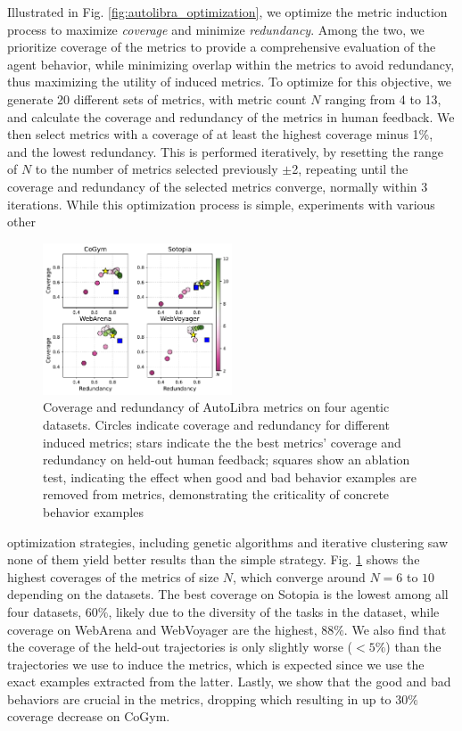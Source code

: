 Illustrated in Fig. \ref{fig:autolibra_optimization}, we optimize the metric induction
process to maximize \emph{coverage} and minimize \emph{redundancy}. Among the
two, we prioritize coverage of the metrics to provide a comprehensive evaluation
of the agent behavior, while minimizing overlap within the metrics to avoid
redundancy, thus maximizing the utility of induced metrics. To optimize for this
objective, we generate 20 different sets of metrics, with metric count $N$
ranging from 4 to 13, and calculate the coverage and redundancy of the metrics in
human feedback. We then select metrics with a coverage of at least the highest
coverage minus 1\%, and the lowest redundancy. This is performed iteratively, by
resetting the range of $N$ to the number of metrics selected previously $\pm$2,
repeating until the coverage and redundancy of the selected metrics converge, normally
within 3 iterations. While this optimization process is simple, experiments with
various other
\begin{figure}
	\vspace{-10pt}
	\includegraphics[width=0.5\textwidth]{figs/four_datasets_grid.pdf}
	\vspace{-15pt}
	\caption{Coverage and redundancy of AutoLibra metrics on four agentic datasets.
	Circles indicate coverage and redundancy for different induced metrics; stars
	indicate the the best metrics' coverage and redundancy on held-out human feedback;
	squares show an ablation test, indicating the effect when good and bad behavior
	examples are removed from metrics, demonstrating the criticality of concrete
	behavior examples}
	\label{fig:coverage-redundancy}
\end{figure}optimization strategies, including genetic algorithms and iterative
clustering saw none of them yield better results than the simple strategy. Fig. \ref{fig:coverage-redundancy}
shows the highest coverages of the metrics of size $N$, which converge around
$N=6$ to $10$ depending on the datasets. The best coverage on Sotopia \citep{zhousotopia}
is the lowest among all four datasets, $60\%$, likely due to the diversity of
the tasks in the dataset, while coverage on WebArena \citep{zhouwebarena} and
WebVoyager \citep{he2024webvoyager} are the highest, $88\%$. We also find that the
coverage of the held-out trajectories is only slightly worse ($<5\%$) than the trajectories
we use to induce the metrics, which is expected since we use the exact examples
extracted from the latter. Lastly, we show that the good and bad behaviors are
crucial in the metrics, dropping which resulting in up to $30\%$ coverage decrease
on CoGym. %

